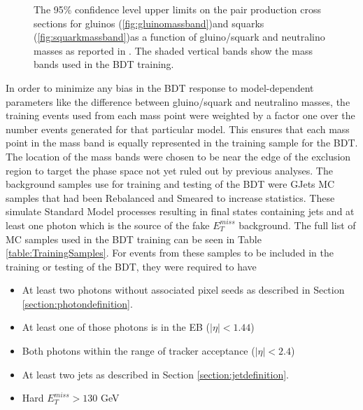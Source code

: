 \begin{figure}[h]
{		\label{fig:squarkmassband}}
	\caption{The 95\% confidence level upper limits on the pair production cross sections for gluinos (\ref{fig:gluinomassband})and squarks (\ref{fig:squarkmassband})as a function of gluino/squark and neutralino masses as reported in \cite{CMS:OldSUSYpaper}.  The shaded vertical bands show the mass bands used in the BDT training.}
	\label{fig:massbands}
\end{figure}
In order to minimize any bias in the BDT response to  model-dependent parameters like the difference between gluino/squark and neutralino masses, the training events used from each mass point were weighted by a factor one over the number events generated for that particular model.  This ensures that each mass point in the mass band is equally represented in the training sample for the BDT.  The location of the mass bands were chosen to be near the edge of the exclusion region to target the phase space not yet ruled out by previous analyses.  The background samples use for training and testing of the BDT were GJets MC samples that had been Rebalanced and Smeared to increase statistics. These simulate Standard Model processes resulting in final states containing jets and at least one photon which is the source of the fake $E^{miss}_T$ background.  The full list of MC samples used in the BDT training can be seen in Table \ref{table:TrainingSamples}.  For events from these samples to be included in the training or testing of the BDT, they were required to have
\begin{itemize}
	\item At least two photons without associated pixel seeds as described in Section \ref{section:photondefinition}.
	\item At least one of those photons is in the EB ($|\eta|<1.44$)
	\item Both photons within the range of tracker acceptance ($|\eta|<2.4$)
	\item At least two jets as described in Section \ref{section:jetdefinition}.
	\item Hard $E^{miss}_T>130$ GeV
\end{itemize}

